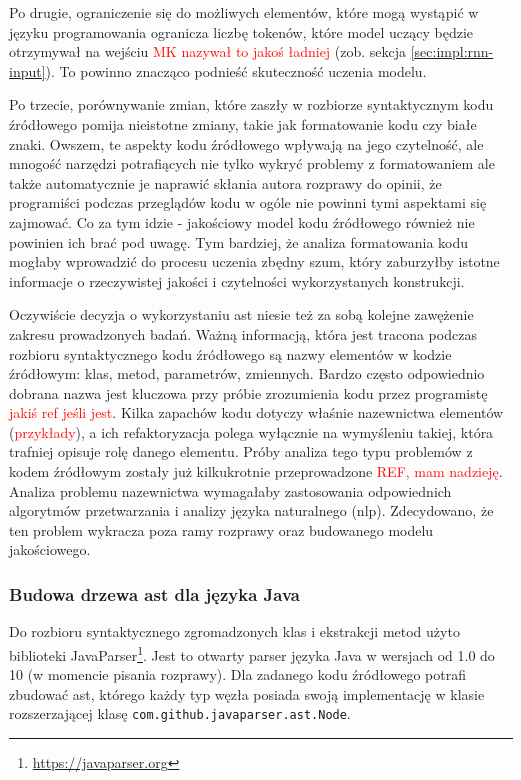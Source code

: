 \documentclass[12pt]{report}
\begin{document}
Po drugie, ograniczenie się do możliwych elementów, które mogą wystąpić w języku programowania ogranicza liczbę tokenów, które model uczący będzie otrzymywał na wejściu \textcolor{red}{MK nazywał to jakoś ładniej} (zob. sekcja \ref{sec:impl:rnn-input}). To powinno znacząco podnieść skuteczność uczenia modelu.

Po trzecie, porównywanie zmian, które zaszły w rozbiorze syntaktycznym kodu źródłowego pomija nieistotne zmiany, takie jak formatowanie kodu czy białe znaki. Owszem, te aspekty kodu źródłowego wpływają na jego czytelność, ale mnogość narzędzi potrafiących nie tylko wykryć problemy z formatowaniem ale także automatycznie je naprawić skłania autora rozprawy do opinii, że programiści podczas przeglądów kodu w ogóle nie powinni tymi aspektami się zajmować. Co za tym idzie - jakościowy model kodu źródłowego również nie powinien ich brać pod uwagę. Tym bardziej, że analiza formatowania kodu mogłaby wprowadzić do procesu uczenia zbędny szum, który zaburzyłby istotne informacje o rzeczywistej jakości i czytelności wykorzystanych konstrukcji.

Oczywiście decyzja o wykorzystaniu \gls{ast} niesie też za sobą kolejne zawężenie zakresu prowadzonych badań. Ważną informacją, która jest tracona podczas rozbioru syntaktycznego kodu źródłowego są nazwy elementów w kodzie źródłowym: klas, metod, parametrów, zmiennych. Bardzo często odpowiednio dobrana nazwa jest kluczowa przy próbie zrozumienia kodu przez programistę \textcolor{red}{jakiś ref jeśli jest}. Kilka zapachów kodu dotyczy właśnie nazewnictwa elementów (\textcolor{red}{przykłady}), a ich refaktoryzacja polega wyłącznie na wymyśleniu takiej, która trafniej opisuje rolę danego elementu. Próby analiza tego typu problemów z kodem źródłowym zostały już kilkukrotnie przeprowadzone \textcolor{red}{REF, mam nadzieję}. Analiza problemu nazewnictwa wymagałaby zastosowania odpowiednich algorytmów przetwarzania i analizy języka naturalnego (\gls{nlp}). Zdecydowano, że ten problem wykracza poza ramy rozprawy oraz budowanego modelu jakościowego.

\subsubsection{Budowa drzewa \gls{ast} dla języka Java}
Do rozbioru syntaktycznego zgromadzonych klas i ekstrakcji metod użyto biblioteki JavaParser\footnote{\url{https://javaparser.org}}. Jest to otwarty parser języka Java w wersjach od 1.0 do 10 (w momencie pisania rozprawy). Dla zadanego kodu źródłowego potrafi zbudować \gls{ast}, którego każdy typ węzła posiada swoją implementację w klasie rozszerzającej klasę \texttt{com.github.javaparser.ast.Node}.
\end{document}
